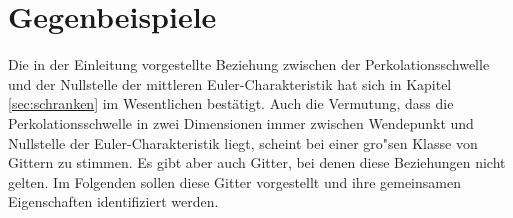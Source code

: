 
\chapter{Gegenbeispiele}
\label{sec:grenzen}

Die in der Einleitung vorgestellte Beziehung zwischen der Perkolationsschwelle und der Nullstelle der mittleren Euler-Charakteristik hat sich in Kapitel \ref{sec:schranken} im Wesentlichen best\"atigt. Auch die Vermutung, dass die Perkolationsschwelle in zwei Dimensionen immer zwischen Wendepunkt und Nullstelle der Euler-Charakteristik liegt, scheint bei einer gro"sen Klasse von Gittern zu stimmen. Es gibt aber auch Gitter, bei denen diese Beziehungen nicht gelten. Im Folgenden sollen diese Gitter vorgestellt und ihre gemeinsamen Eigenschaften identifiziert werden.

